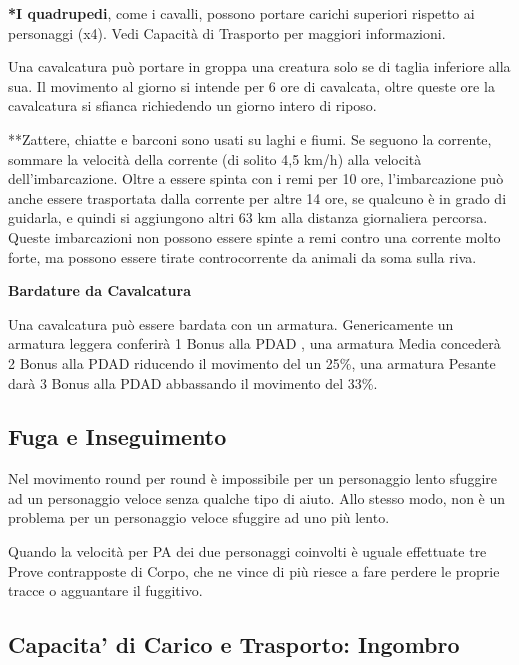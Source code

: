 \documentclass[12pt,a4paper,twoside,openany]{book}
\begin{document}
\begin{multicols}{2}

\bigskip

\textbf{*I quadrupedi}, come i cavalli, possono portare carichi superiori rispetto ai personaggi (x4). Vedi Capacità di Trasporto per maggiori informazioni.

Una cavalcatura può portare in groppa una creatura solo se di taglia inferiore alla sua. Il movimento al giorno si intende per 6 ore di cavalcata, oltre queste ore la cavalcatura si sfianca richiedendo un giorno intero di riposo.

**Zattere, chiatte e barconi sono usati su laghi e fiumi. Se seguono la corrente, sommare la velocità della corrente (di solito 4,5 km/h) alla velocità dell'imbarcazione. Oltre a essere spinta con i remi per 10 ore, l'imbarcazione può anche essere trasportata dalla corrente per altre 14 ore, se qualcuno è in grado di guidarla, e quindi si aggiungono altri 63 km alla distanza giornaliera percorsa. Queste imbarcazioni non possono essere spinte a remi contro una corrente molto forte, ma possono essere tirate controcorrente da animali da soma sulla riva.

\textbf{Bardature da Cavalcatura}

Una cavalcatura può essere bardata con un armatura. Genericamente un armatura leggera conferirà 1 Bonus alla PDAD , una armatura Media concederà 2 Bonus alla PDAD riducendo il movimento del un 25\%, una armatura Pesante darà 3 Bonus alla PDAD abbassando il movimento del 33\%.

\subsection{Fuga e Inseguimento}\label{fugainseguimento}

Nel movimento round per round è impossibile per un personaggio lento sfuggire ad un personaggio veloce senza qualche tipo di aiuto. Allo stesso modo, non è un problema per un personaggio veloce sfuggire ad uno più lento.

Quando la velocità per PA dei due personaggi coinvolti è uguale effettuate tre Prove contrapposte di Corpo, che ne vince di più riesce a fare perdere le proprie tracce o agguantare il fuggitivo.

\subsection{Capacita' di Carico e Trasporto: Ingombro}


\end{multicols}
\end{document}
